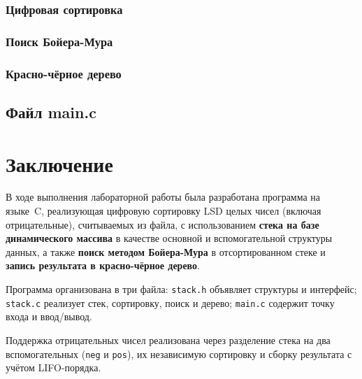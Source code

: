 \documentclass[a4paper,14pt]{extarticle}
\begin{document}


\subsubsection*{Цифровая сортировка}



\subsubsection*{Поиск Бойера-Мура}



\subsubsection*{Красно-чёрное дерево}



\subsection{Файл main.c}



\newpage
\section*{Заключение}

В ходе выполнения лабораторной работы была разработана программа на языке~C, реализующая цифровую сортировку LSD целых чисел (включая отрицательные), считываемых из файла, с использованием \textbf{стека на базе динамического массива} в качестве основной и вспомогательной структуры данных, а также \textbf{поиск методом Бойера-Мура} в отсортированном стеке и \textbf{запись результата в красно-чёрное дерево}.

Программа организована в три файла: \texttt{stack.h} объявляет структуры и интерфейс; \texttt{stack.c} реализует стек, сортировку, поиск и дерево; \texttt{main.c} содержит точку входа и ввод/вывод.

Поддержка отрицательных чисел реализована через разделение стека на два вспомогательных (\texttt{neg} и \texttt{pos}), их независимую сортировку и сборку результата с учётом LIFO-порядка.
\end{document}
